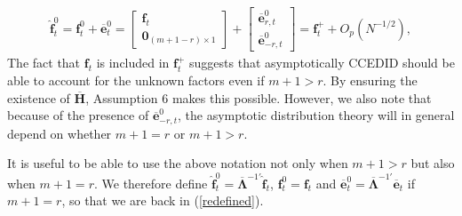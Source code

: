 \documentclass[12pt,fleqn]{article}
\def\*#1{\mathbf{#1}}
\def\+#1{\boldsymbol{#1}}
\begin{document}
\begin{align}
\widehat{\*{f}}_t^0 = \*f_t^{0} + \overline{\*e}_t^{0} = \left[\begin{array}{c} \*f_t \\
    \*{0}_{(m+1-r)\times 1} \end{array}\right] + \left[\begin{array}{c} \overline{\*e}_{r,t}^{0} \\
    \overline{\*e}_{-r,t}^{0} \end{array}\right] = \*f_t^+ +  O_p(N^{-1/2}),
\end{align}
The fact that $\*{f}_t$ is included in $\*f_t^+$ suggests that asymptotically CCEDID should be able to account for the unknown factors even if $m + 1> r$. By ensuring the existence of $\overline{\*{H}}$, Assumption 6 makes this possible. However, we also note that because of the presence of $\overline{\*{e}}_{-r,t}^0$, the asymptotic distribution theory will in general depend on whether $m+1=r$ or $m +1> r$.

It is useful to be able to use the above notation not only when $m+1> r$ but also when $m+1=r$. We therefore define $\widehat{\*{f}}^0_t=\overline{\+{\Lambda}}^{-1\prime}\widehat{\*{f}}_t$, $\*{f}^0_t = \*{f}_t$ and $\overline{\*{e}}^0_t = \overline{\+{\Lambda}}^{-1\prime}\overline{\*{e}}_t$ if $m+1=r$, so that we are back in (\ref{redefined}).
\end{document}
